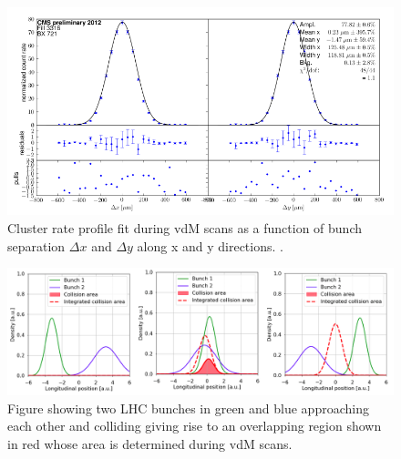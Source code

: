 \begin{figure}[H]
  \centering
  \includegraphics[width=0.7\columnwidth]{./vdm_ratefit.png}
  \caption{ \onehalfspacing Cluster rate profile fit during vdM scans as a function of bunch separation $\Delta x$ and $\Delta y$ along x and y directions. \cite{CMS-PAS-LUM-15-001}.}
  \label{fig:CMS}
\end{figure}


\begin{figure}[H]
  \centering
  \includegraphics[width=\columnwidth]{./vdm_image.png}
  \caption{\onehalfspacing Figure showing two LHC bunches in green and blue approaching each other and colliding giving rise to an overlapping region shown in red whose area is determined during vdM scans.}
  \label{fig:CMS}
\end{figure}






